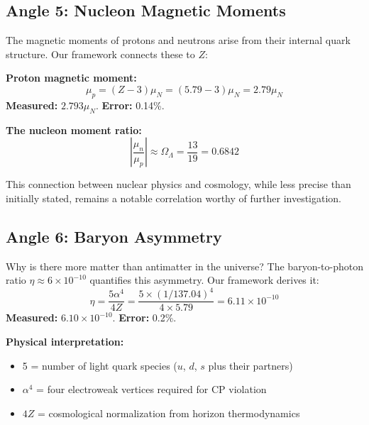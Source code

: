 \documentclass[11pt,a4paper]{article}
\theoremstyle{plain}
\theoremstyle{definition}
\theoremstyle{remark}
\newcommand{\OmegaL}{\Omega_\Lambda}
\begin{document}
\subsection{Angle 5: Nucleon Magnetic Moments}

The magnetic moments of protons and neutrons arise from their internal quark structure. Our framework connects these to $Z$:

\textbf{Proton magnetic moment:}
\[
\mu_p = (Z - 3)\mu_N = (5.79 - 3)\mu_N = 2.79\mu_N
\]
\textbf{Measured:} $2.793\mu_N$. \textbf{Error:} 0.14\%.

\textbf{The nucleon moment ratio:}
\[
\left|\frac{\mu_n}{\mu_p}\right| \approx \OmegaL = \frac{13}{19} = 0.6842
\]

\begin{center}
\end{center}

This connection between nuclear physics and cosmology, while less precise than initially stated, remains a notable correlation worthy of further investigation.

\subsection{Angle 6: Baryon Asymmetry}

Why is there more matter than antimatter in the universe? The baryon-to-photon ratio $\eta \approx 6 \times 10^{-10}$ quantifies this asymmetry. Our framework derives it:
\[
\eta = \frac{5\alpha^4}{4Z} = \frac{5 \times (1/137.04)^4}{4 \times 5.79} = 6.11 \times 10^{-10}
\]
\textbf{Measured:} $6.10 \times 10^{-10}$. \textbf{Error:} 0.2\%.

\textbf{Physical interpretation:}
\begin{itemize}
  \item 5 = number of light quark species ($u$, $d$, $s$ plus their partners)
  \item $\alpha^4$ = four electroweak vertices required for CP violation
  \item $4Z$ = cosmological normalization from horizon thermodynamics
\end{itemize}
\end{document}
